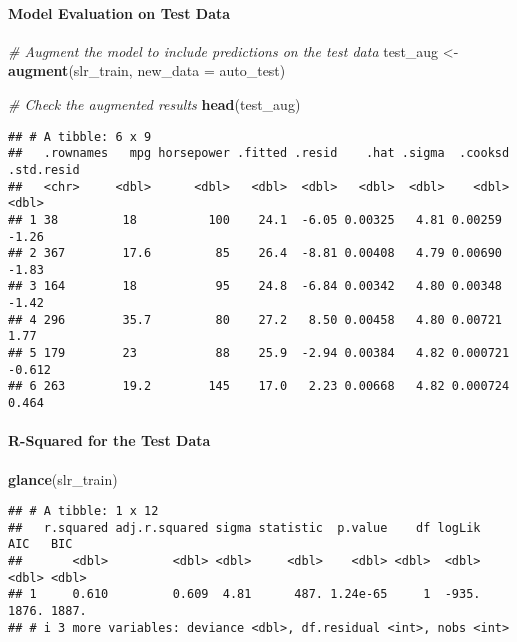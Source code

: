 \documentclass[
]{article}
\newenvironment{Shaded}{\begin{snugshade}}{\end{snugshade}}
\newcommand{\AttributeTok}[1]{\textcolor[rgb]{0.13,0.29,0.53}{#1}}
\newcommand{\CommentTok}[1]{\textcolor[rgb]{0.56,0.35,0.01}{\textit{#1}}}
\newcommand{\FunctionTok}[1]{\textcolor[rgb]{0.13,0.29,0.53}{\textbf{#1}}}
\newcommand{\NormalTok}[1]{#1}
\newcommand{\OtherTok}[1]{\textcolor[rgb]{0.56,0.35,0.01}{#1}}
\begin{document}
\paragraph{Model Evaluation on Test
Data}\label{model-evaluation-on-test-data}

\begin{Shaded}
\begin{Highlighting}[]
\CommentTok{\# Augment the model to include predictions on the test data}
\NormalTok{test\_aug }\OtherTok{\textless{}{-}} \FunctionTok{augment}\NormalTok{(slr\_train, }\AttributeTok{new\_data =}\NormalTok{ auto\_test)}

\CommentTok{\# Check the augmented results}
\FunctionTok{head}\NormalTok{(test\_aug)}
\end{Highlighting}
\end{Shaded}

\begin{verbatim}
## # A tibble: 6 x 9
##   .rownames   mpg horsepower .fitted .resid    .hat .sigma  .cooksd .std.resid
##   <chr>     <dbl>      <dbl>   <dbl>  <dbl>   <dbl>  <dbl>    <dbl>      <dbl>
## 1 38         18          100    24.1  -6.05 0.00325   4.81 0.00259      -1.26 
## 2 367        17.6         85    26.4  -8.81 0.00408   4.79 0.00690      -1.83 
## 3 164        18           95    24.8  -6.84 0.00342   4.80 0.00348      -1.42 
## 4 296        35.7         80    27.2   8.50 0.00458   4.80 0.00721       1.77 
## 5 179        23           88    25.9  -2.94 0.00384   4.82 0.000721     -0.612
## 6 263        19.2        145    17.0   2.23 0.00668   4.82 0.000724      0.464
\end{verbatim}

\paragraph{R-Squared for the Test
Data}\label{r-squared-for-the-test-data}

\begin{Shaded}
\begin{Highlighting}[]
\FunctionTok{glance}\NormalTok{(slr\_train)}
\end{Highlighting}
\end{Shaded}

\begin{verbatim}
## # A tibble: 1 x 12
##   r.squared adj.r.squared sigma statistic  p.value    df logLik   AIC   BIC
##       <dbl>         <dbl> <dbl>     <dbl>    <dbl> <dbl>  <dbl> <dbl> <dbl>
## 1     0.610         0.609  4.81      487. 1.24e-65     1  -935. 1876. 1887.
## # i 3 more variables: deviance <dbl>, df.residual <int>, nobs <int>
\end{verbatim}
\end{document}
